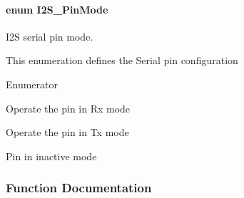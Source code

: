 \paragraph[{I2\+S\+\_\+\+Pin\+Mode}]{\setlength{\rightskip}{0pt plus 5cm}enum {\bf I2\+S\+\_\+\+Pin\+Mode}}\label{_i2_s_8h_a68adf81f32430f87478afbc63e0623af}


I2\+S serial pin mode. 

This enumeration defines the Serial pin configuration \begin{Desc}
\item[Enumerator]\par
\begin{description}
\item[{\em 
I2\+S\+\_\+\+P\+I\+N\+M\+O\+D\+E\+\_\+\+R\+X\label{_i2_s_8h_a68adf81f32430f87478afbc63e0623afa581622afe5daeecf01b66fb9c07c026b}
}]Operate the pin in Rx mode \item[{\em 
I2\+S\+\_\+\+P\+I\+N\+M\+O\+D\+E\+\_\+\+T\+X\label{_i2_s_8h_a68adf81f32430f87478afbc63e0623afa70c2a974a0b4fe247127546c4583cdfc}
}]Operate the pin in Tx mode \item[{\em 
I2\+S\+\_\+\+P\+I\+N\+M\+O\+D\+E\+\_\+\+I\+N\+A\+C\+T\+I\+V\+E\label{_i2_s_8h_a68adf81f32430f87478afbc63e0623aface52223cb7a46097543160547d9ff35d}
}]Pin in inactive mode \end{description}
\end{Desc}


\subsubsection{Function Documentation}
